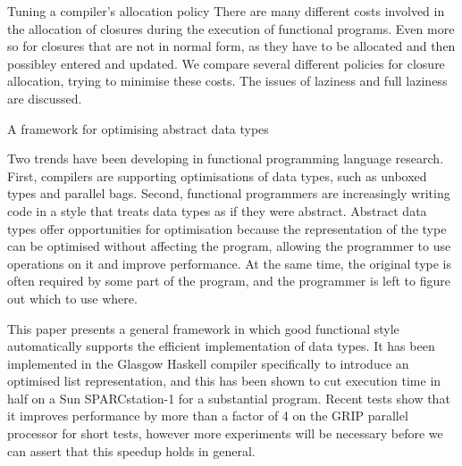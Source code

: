 {Tuning a compiler's allocation policy}
{\GlasgowNinetyThree{}}
{There are many different costs involved in the allocation of
closures during the execution of functional programs.  Even more so
for closures that are not in normal form, as they have to be
allocated and then possibley entered and updated.  We compare several
different policies for closure allocation, trying to minimise these
costs.  The issues of laziness and full laziness are discussed.
}

{A framework for optimising abstract data types}
{\GlasgowNinetyThree{}}
{Two trends have been developing in functional programming language
research. First, compilers are supporting optimisations of data
types, such as unboxed types and parallel bags.  Second, functional
programmers are increasingly writing code in a style that treats
data types as if they were abstract. Abstract data types offer
opportunities for optimisation because the representation of the
type can be optimised without affecting the program, allowing the
programmer to use operations on it and improve performance. At the
same time, the original type is often required by some part of the
program, and the programmer is left to figure out which to use
where.

This paper presents a general framework in which good functional
style automatically supports the efficient implementation of data
types.  It has been implemented in the Glasgow Haskell compiler
specifically to introduce an optimised list representation, and
this has been shown to cut execution time in half on a Sun
SPARCstation-1 for a substantial program.  Recent tests show that
it improves performance by more than a factor of 4 on the GRIP
parallel processor for short tests, however more experiments will
be necessary before we can assert that this speedup holds in
general.
}






